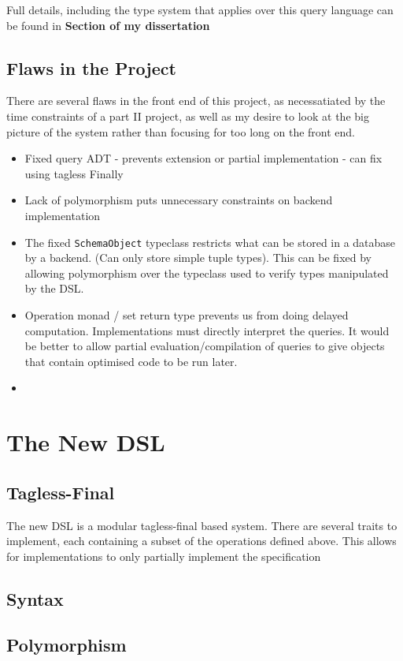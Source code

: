 \documentclass{report}
\newcommand \2[0]{\textbf{2}}
\newcommand \3[0]{\textbf{3}}
\newcommand{\todo}[1]{\textbf{#1}}
\begin{document}
Full details, including the type system that applies over this query language can be found in \todo{Section of my dissertation}
\section{Flaws in the Project}
There are several flaws in the front end of this project, as necessatiated by the time constraints of a part II project, as well as my desire to look at the big picture of the system rather than focusing for too long on the front end.

\begin{itemize}
\item Fixed query ADT - prevents extension or partial implementation - can fix using tagless Finally
\item Lack of polymorphism puts unnecessary constraints on backend implementation
\item The fixed \texttt{SchemaObject} typeclass restricts what can be stored in a database by a backend. (Can only store simple tuple types). This can be fixed by allowing polymorphism over the typeclass used to verify types manipulated by the DSL.
\item Operation monad / set return type prevents us from doing delayed computation. Implementations must directly interpret the queries. It would be better to allow partial evaluation/compilation of queries to give objects that contain optimised code to be run later.
\item 
\end{itemize}

\chapter{The New DSL}
 
\section{Tagless-Final}
The new DSL is a modular tagless-final based system. There are several traits to implement, each containing a subset of the operations defined above. This allows for implementations to only partially implement the specification


\section{Syntax}

\section{Polymorphism}
\end{document}
